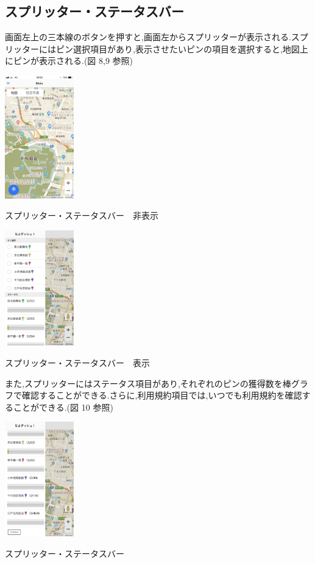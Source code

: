 \documentclass[a4paper, twoside]{jarticle}
\makeatletter
\newenvironment{figurehere}
  {\def\@captype{figure}}
  {}
\makeatother
\begin{document}
\begin{multicols}{2}
\subsection{スプリッター・ステータスバー}
画面左上の三本線のボタンを押すと,画面左からスプリッターが表示される.スプリッターにはピン選択項目があり,表示させたいピンの項目を選択すると,地図上にピンが表示される.(図 8,9 参照)
\begin{figurehere}
\begin{center}
\includegraphics[bb=30 50 550 1300,width=3cm]{./image09-0.jpg}%
\end{center}
\caption{スプリッター・ステータスバー　非表示}\label{fig:8}
\begin{center}
\includegraphics[bb=30 50 550 1300,width=3cm]{./image09.jpg}%
\end{center}
\caption{スプリッター・ステータスバー　表示}\label{fig:9}
\end{figurehere}

また,スプリッターにはステータス項目があり,それぞれのピンの獲得数を棒グラフで確認することができる.さらに,利用規約項目では,いつでも利用規約を確認することができる.(図 10 参照)
\begin{figurehere}
\begin{center}
\includegraphics[bb=30 50 550 1300,width=3cm]{./image10.jpg}%
\end{center}
\caption{スプリッター・ステータスバー}\label{fig:10}
\end{figurehere}



\end{multicols}
\end{document}
